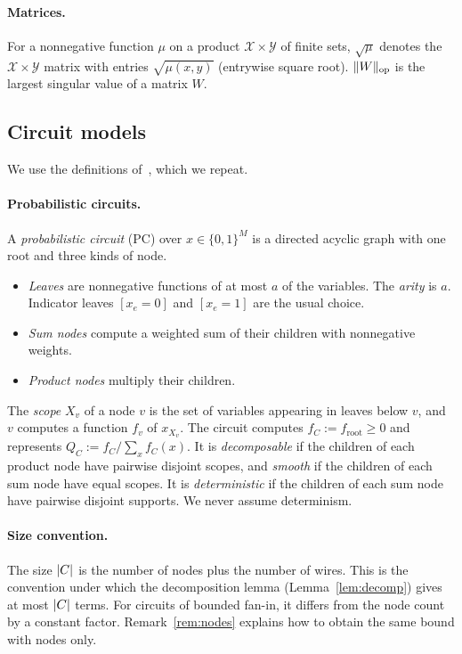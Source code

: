 \paragraph{Matrices.} For a nonnegative function $\mu$ on a product $\mathcal X\times\mathcal Y$ of finite sets, $\sqrt\mu$ denotes the $\mathcal X\times\mathcal Y$ matrix with entries $\sqrt{\mu(x,y)}$ (entrywise square root). $\lVert W\rVert_{\mathrm{op}}$ is the largest singular value of a matrix $W$.

\subsection{Circuit models}\label{sec:models}

We use the definitions of~\cite[Sec.~2.1]{Blaschke26Dimers}, which we repeat.

\paragraph{Probabilistic circuits.} A \emph{probabilistic circuit} (PC) over $x\in\{0,1\}^M$ is a directed acyclic graph with one root and three kinds of node.
\begin{itemize}
\item \emph{Leaves} are nonnegative functions of at most $a$ of the variables. The \emph{arity} is $a$. Indicator leaves $[x_e=0]$ and $[x_e=1]$ are the usual choice.
\item \emph{Sum nodes} compute a weighted sum of their children with nonnegative weights.
\item \emph{Product nodes} multiply their children.
\end{itemize}
The \emph{scope} $X_v$ of a node $v$ is the set of variables appearing in leaves below $v$, and $v$ computes a function $f_v$ of $x_{X_v}$. The circuit computes $f_C:=f_{\mathrm{root}}\ge0$ and represents $Q_C:=f_C/\sum_xf_C(x)$. It is \emph{decomposable} if the children of each product node have pairwise disjoint scopes, and \emph{smooth} if the children of each sum node have equal scopes. It is \emph{deterministic} if the children of each sum node have pairwise disjoint supports. We never assume determinism.

\paragraph{Size convention.} The size $\lvert C\rvert$ is the number of nodes plus the number of wires. This is the convention under which the decomposition lemma (Lemma~\ref{lem:decomp}) gives at most $\lvert C\rvert$ terms. For circuits of bounded fan-in, it differs from the node count by a constant factor. Remark~\ref{rem:nodes} explains how to obtain the same bound with nodes only.

